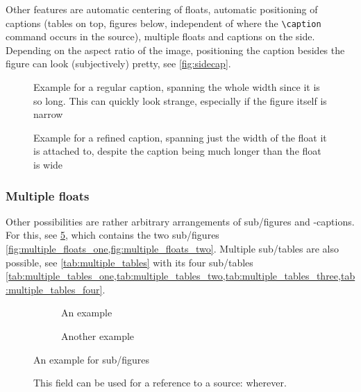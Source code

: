 \begin{description}
          Other features are automatic centering of floats, automatic positioning
          of captions (tables on top, figures below, independent of where the
          \verb|\caption| command occurs in the source), multiple floats and
          captions on the side.
          Depending on the aspect ratio of the image, positioning the caption besides
          the figure can look (subjectively) pretty, see \cref{fig:sidecap}.
\end{description}

\begin{figure}[tbp]
    \centering
    \captionsetup{width=\linewidth}
    
    \caption{%
        Example for a regular caption,
        spanning the whole width since it is so long.
        This can quickly look strange, especially if the figure itself is narrow%
    }
    \label{fig:wide_caption}
\end{figure}

\begin{figure}[tbp]
    \centering
    \captionsetup{width=0.45\linewidth}
    
    \caption{%
        Example for a refined caption, spanning just the width of the float
        it is attached to, despite the caption being much longer than the
        float is wide%
    }
    \label{fig:tighter_caption}
\end{figure}

\subsubsection{Multiple floats}

Other possibilities are rather arbitrary arrangements of sub\-/figures and -captions.
For this, see \cref{fig:multiple_floats}, which contains the two sub\-/figures
\cref{fig:multiple_floats_one,fig:multiple_floats_two}.
Multiple sub\-/tables are also possible, see \cref{tab:multiple_tables} with its four
sub\-/tables
\cref{tab:multiple_tables_one,tab:multiple_tables_two,tab:multiple_tables_three,tab:multiple_tables_four}.

\begin{figure}[tbp]
    \begin{subfigure}[t]{0.48\linewidth}
        \centering
        
        \caption{An example}
        \label{fig:multiple_floats_one}
    \end{subfigure}
    \hfill
    \begin{subfigure}[t]{0.48\linewidth}
        \centering
        
        \caption{Another example}
        \label{fig:multiple_floats_two}
    \end{subfigure}
    \caption{An example for sub\-/figures}
    \label{fig:multiple_floats}
    \caption*{This field can be used for a reference to a source: \adaptedfrom{} wherever.}
\end{figure}

